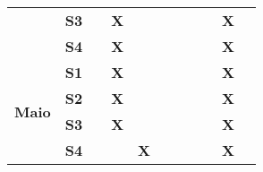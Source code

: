 \begin{table}[]
\begin{tabular}{|clllclllllllllll|}
\\ \cline{5-15} 
\multicolumn{4}{|c|}{}                                   & \multicolumn{3}{c|}{\textbf{S3}}                      & \multicolumn{1}{l|}{\textbf{}}  & \multicolumn{1}{l|}{\textbf{X}} & \multicolumn{1}{l|}{\textbf{}}  & \multicolumn{1}{l|}{\textbf{}}  & \multicolumn{1}{l|}{\textbf{}}  & \multicolumn{1}{l|}{\textbf{}}  & \multicolumn{1}{l|}{\textbf{}}  & \multicolumn{1}{l|}{\textbf{X}}
\\ \cline{5-15} 
\multicolumn{4}{|c|}{}                                   & \multicolumn{3}{c|}{\textbf{S4}}                      & \multicolumn{1}{l|}{\textbf{}}  & \multicolumn{1}{l|}{\textbf{X}} & \multicolumn{1}{l|}{\textbf{}}  & \multicolumn{1}{l|}{\textbf{}}  & \multicolumn{1}{l|}{\textbf{}}  & \multicolumn{1}{l|}{\textbf{}}  & \multicolumn{1}{l|}{\textbf{}}  & \multicolumn{1}{l|}{\textbf{X}}
\\ \hline
\multicolumn{4}{|c|}{\multirow{4}{*}{\textbf{Maio}}}     & \multicolumn{3}{c|}{\textbf{S1}}                      & \multicolumn{1}{l|}{\textbf{}}  & \multicolumn{1}{l|}{\textbf{X}} & \multicolumn{1}{l|}{\textbf{}}  & \multicolumn{1}{l|}{\textbf{}}  & \multicolumn{1}{l|}{\textbf{}}  & \multicolumn{1}{l|}{\textbf{}}  & \multicolumn{1}{l|}{\textbf{}}  & \multicolumn{1}{l|}{\textbf{X}}
\\ \cline{5-15} 
\multicolumn{4}{|c|}{}                                   & \multicolumn{3}{c|}{\textbf{S2}}                      & \multicolumn{1}{l|}{\textbf{}}  & \multicolumn{1}{l|}{\textbf{X}} & \multicolumn{1}{l|}{\textbf{}}  & \multicolumn{1}{l|}{\textbf{}}  & \multicolumn{1}{l|}{\textbf{}}  & \multicolumn{1}{l|}{\textbf{}}  & \multicolumn{1}{l|}{\textbf{}}  & \multicolumn{1}{l|}{\textbf{X}}
\\ \cline{5-15} 
\multicolumn{4}{|c|}{}                                   & \multicolumn{3}{c|}{\textbf{S3}}                      & \multicolumn{1}{l|}{\textbf{}}  & \multicolumn{1}{l|}{\textbf{X}} & \multicolumn{1}{l|}{\textbf{}}  & \multicolumn{1}{l|}{\textbf{}}  & \multicolumn{1}{l|}{\textbf{}}  & \multicolumn{1}{l|}{\textbf{}}  & \multicolumn{1}{l|}{\textbf{}}  & \multicolumn{1}{l|}{\textbf{X}}
\\ \cline{5-15} 
\multicolumn{4}{|c|}{}                                   & \multicolumn{3}{c|}{\textbf{S4}}                      & \multicolumn{1}{l|}{\textbf{}}  & \multicolumn{1}{l|}{\textbf{}}  & \multicolumn{1}{l|}{\textbf{X}} & \multicolumn{1}{l|}{\textbf{}}  & \multicolumn{1}{l|}{\textbf{}}  & \multicolumn{1}{l|}{\textbf{}}  & \multicolumn{1}{l|}{\textbf{}}  & \multicolumn{1}{l|}{\textbf{X}}

\end{tabular}
\end{table}
